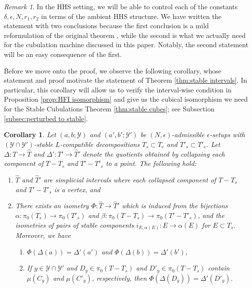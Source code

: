 \documentclass{amsart}
\newtheorem{corollary}[theorem]{Corollary}
\theoremstyle{definition}
\theoremstyle{remark}
\newtheorem{remark}[theorem]{Remark}
\theoremstyle{definition}
\newcommand{\calY}{\mathcal{Y}}
\newcommand{\hT}{\widehat{T}}
\begin{document}
\begin{remark}
In the HHS setting, we will be able to control each of the constants $\delta, \epsilon, N, r_1,r_2$ in terms of the ambient HHS structure.  We have written the statement with two conclusions because the first conclusion is a mild reformulation of the original theorem \cite[Theorem 3.2]{DMS_bary}, while the second is what we actually need for the cubulation machine discussed in this paper.  Notably, the second statement will be an easy consequence of the first.
\end{remark}

Before we move onto the proof, we observe the following corollary, whose statement and proof motivate the statement of Theorem \ref{thm:stable intervals}.  In particular, this corollary will allow us to verify the interval-wise condition in Proposition \ref{prop:HFI isomorphism} and give us the cubical isomorphism we need for the Stable Cubulations Theorem \ref{thm:stable cubes}; see Subsection \ref{subsec:perturbed to stable}.

\begin{corollary}\label{cor:interval isometry}
Let $(a,b;\calY)$ and $(a',b'; \calY')$ be $(N,\epsilon)$-admissible $\epsilon$-setups with $(\calY \cap \calY')$-stable $L$-compatible decompositions $T_s \subset T_e$ and $T'_s \subset T'_e$.   Let $\Delta:T \to \hT$ and $\Delta':T' \to \hT'$ denote the quotients obtained by collapsing each component of $T-T_s$ and $T'-T'_s$ to a point.  The following hold:
\begin{enumerate}
\item $\hT$ and $\hT'$ are simplicial intervals where each collapsed component of $T-T_s$ and $T'-T'_s$ is a vertex, and
\item There exists an isometry $\Phi:\hT \to \hT'$ which is induced from the bijections $\alpha:\pi_0(T_s) \to \pi_0(T'_s)$ and $\beta:\pi_0(T-T_s) \to \pi_0(T'-T'_s)$, and the isometries of pairs of stable components $i_{E,\alpha(E)}:E \to \alpha(E)$ for $E \subset T_s$.   Moreover, we have
\begin{enumerate}
\item $\Phi(\Delta(a)) = \Delta'(a')$ and $\Phi(\Delta(b)) = \Delta'(b')$,
\item If $y \in \calY \cap \calY'$ and $D_y \in \pi_0(T - T_s)$ and $D'_y \in \pi_0(T - T_s)$ contain $\mu(C_y)$ and $\mu(C'_y)$, respectively, then $\Phi(\Delta(D_y)) = \Delta'(D'_y)$. 
\end{enumerate}
\end{enumerate}
\end{corollary}
\end{document}

